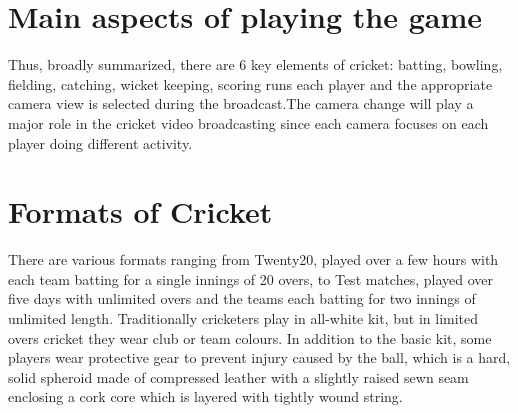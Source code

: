 \section{Main aspects of playing the game}
Thus, broadly summarized, there are 6 key elements of cricket:
batting, bowling, fielding, catching, wicket keeping, scoring runs each player and the appropriate camera view is selected during the broadcast.The camera change will play a major role in the cricket video broadcasting since each camera focuses on each player doing different activity.
\section{Formats of Cricket}
There are various formats ranging from Twenty20, played over a few hours with each team batting for a single innings of 20 overs, to Test matches, played over five days with unlimited overs and the teams each batting for two innings of unlimited length. Traditionally cricketers play in all-white kit, but in limited overs cricket they wear club or team colours. In addition to the basic kit, some players wear protective gear to prevent injury caused by the ball, which is a hard, solid spheroid made of compressed leather with a slightly raised sewn seam enclosing a cork core which is layered with tightly wound string.
